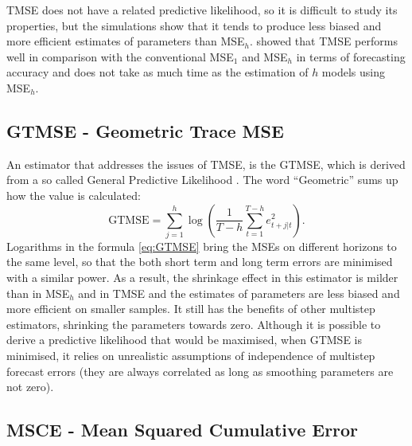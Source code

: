\documentclass[
]{book}
\theoremstyle{definition}
\theoremstyle{definition}
\theoremstyle{definition}
\theoremstyle{definition}
\theoremstyle{remark}
\begin{document}
TMSE does not have a related predictive likelihood, so it is difficult to study its properties, but the simulations show that it tends to produce less biased and more efficient estimates of parameters than MSE\(_h\). \citet{Kourentzes2019} showed that TMSE performs well in comparison with the conventional MSE\(_1\) and MSE\(_h\) in terms of forecasting accuracy and does not take as much time as the estimation of \(h\) models using MSE\(_h\).

\hypertarget{multistepLossesGTMSE}{%
\subsection{GTMSE - Geometric Trace MSE}\label{multistepLossesGTMSE}}

An estimator that addresses the issues of TMSE, is the GTMSE, which is derived from a so called General Predictive Likelihood \citep[GPL by][]{Svetunkov2020Multistep}. The word ``Geometric'' sums up how the value is calculated:
\begin{equation}
    \mathrm{GTMSE} =  \sum_{j=1}^h \log \left(\frac{1}{T-h} \sum_{t=1}^{T-h} e_{t+j|t}^2 \right).
  \label{eq:GTMSE}
\end{equation}
Logarithms in the formula \eqref{eq:GTMSE} bring the MSEs on different horizons to the same level, so that the both short term and long term errors are minimised with a similar power. As a result, the shrinkage effect in this estimator is milder than in MSE\(_h\) and in TMSE and the estimates of parameters are less biased and more efficient on smaller samples. It still has the benefits of other multistep estimators, shrinking the parameters towards zero. Although it is possible to derive a predictive likelihood that would be maximised, when GTMSE is minimised, it relies on unrealistic assumptions of independence of multistep forecast errors (they are always correlated as long as smoothing parameters are not zero).

\hypertarget{msce---mean-squared-cumulative-error}{%
\subsection{MSCE - Mean Squared Cumulative Error}\label{msce---mean-squared-cumulative-error}}
\end{document}
